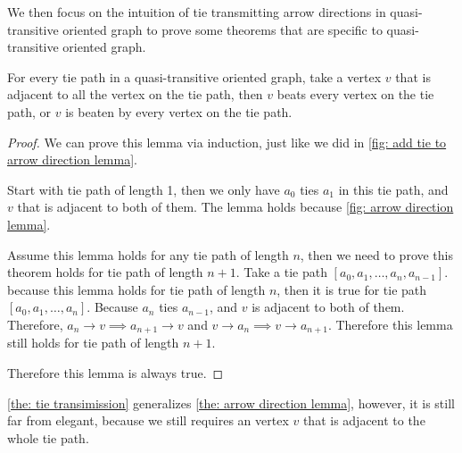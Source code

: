 We then focus on the intuition of tie transmitting
arrow directions in quasi-transitive oriented graph to
prove some theorems that are specific to quasi-transitive
oriented graph.

\begin{lemma}\label{the: tie transimission}
  For every tie path in a quasi-transitive oriented graph,
  take a vertex \(v\) that is adjacent to all the vertex
  on the tie path,
  then \(v\) beats every vertex on the tie path,
  or \(v\) is beaten by every vertex on the tie path.
\end{lemma}

\begin{proof}
  We can prove this lemma via induction,
  just like we did in
  \cref{fig: add tie to arrow direction lemma}.

  Start with tie path of length 1,
  then we only have \(a_0\) ties \(a_1\) in this tie path,
  and \(v\) that is adjacent to both of them.
  The lemma holds because \cref{fig: arrow direction lemma}.

  Assume this lemma holds for any tie path of length \(n\),
  then we need to prove this theorem holds for
  tie path of length \(n + 1\).
  Take a tie path \([a_0, a_1, \ldots, a_n, a_{n - 1}]\).
  because this lemma holds for tie path of length \(n\),
  then it is true for tie path \([a_0, a_1, \ldots, a_n]\).
  Because \(a_n\) ties \(a_{n-1}\), and
  \(v\) is adjacent to both of them.
  Therefore, \(a_n \to v \implies a_{n+1} \to v\) and
  \(v \to a_n \implies v \to a_{n+1}\).
  Therefore this lemma still holds for tie path of length \(n + 1\).

  Therefore this lemma is always true.
\end{proof}

\cref{the: tie transimission} generalizes
\cref{the: arrow direction lemma},
however, it is still far from elegant,
because we still requires an vertex \(v\) that is adjacent to
the whole tie path.
